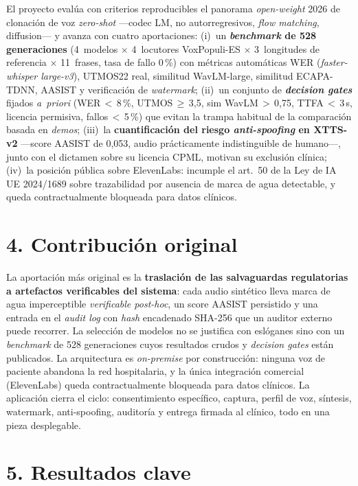 \documentclass[11pt,a4paper]{article}
\begin{document}
El proyecto evalúa con criterios reproducibles el panorama \emph{open-weight} 2026 de clonación de voz \emph{zero-shot} ---codec LM, no autorregresivos, \emph{flow matching}, diffusion--- y avanza con cuatro aportaciones: (i)~un \textbf{\emph{benchmark} de 528 generaciones} (4~modelos $\times$ 4~locutores VoxPopuli-ES $\times$ 3~longitudes de referencia $\times$ 11~frases, tasa de fallo 0\,\%) con métricas automáticas WER (\emph{faster-whisper large-v3}), UTMOS22 real, similitud WavLM-large, similitud ECAPA-TDNN, AASIST y verificación de \emph{watermark}; (ii)~un conjunto de \textbf{\emph{decision gates}} fijados \emph{a~priori} (WER\,$<$\,8\,\%, UTMOS\,$\geq$\,3{,}5, sim WavLM\,$>$\,0{,}75, TTFA\,$<$\,3\,s, licencia permisiva, fallos\,$<$\,5\,\%) que evitan la trampa habitual de la comparación basada en \emph{demos}; (iii)~la \textbf{cuantificación del riesgo \emph{anti-spoofing} en XTTS-v2} ---score AASIST de 0{,}053, audio prácticamente indistinguible de humano---, junto con el dictamen sobre su licencia CPML, motivan su exclusión clínica; (iv)~la posición pública sobre ElevenLabs: incumple el art.~50 de la Ley de IA UE 2024/1689 sobre trazabilidad por ausencia de marca de agua detectable, y queda contractualmente bloqueada para datos clínicos.

\section*{4. Contribución original}

La aportación más original es la \textbf{traslación de las salvaguardas regulatorias a artefactos verificables del sistema}: cada audio sintético lleva marca de agua imperceptible \emph{verificable post-hoc}, un score AASIST persistido y una entrada en el \emph{audit log} con \emph{hash} encadenado SHA-256 que un auditor externo puede recorrer. La selección de modelos no se justifica con eslóganes sino con un \emph{benchmark} de 528 generaciones cuyos resultados crudos y \emph{decision gates} están publicados. La arquitectura es \emph{on-premise} por construcción: ninguna voz de paciente abandona la red hospitalaria, y la única integración comercial (ElevenLabs) queda contractualmente bloqueada para datos clínicos. La aplicación cierra el ciclo: consentimiento específico, captura, perfil de voz, síntesis, watermark, anti-spoofing, auditoría y entrega firmada al clínico, todo en una pieza desplegable.

\section*{5. Resultados clave}
\end{document}
